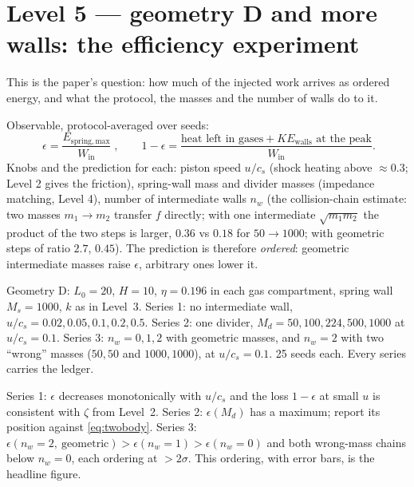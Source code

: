 \documentclass[11pt,a4paper]{article}
\begin{document}
\section{Level 5 --- geometry D and more walls: the efficiency experiment}

\begin{why}
This is the paper's question: how much of the injected work arrives as ordered energy, and what the protocol, the masses and the number of walls do to it.
\end{why}

Observable, protocol-averaged over seeds:
\begin{equation}
\boxed{\;\epsilon = \frac{E_{\mathrm{spring,max}}}{W_{\mathrm{in}}}\;},\qquad
1 - \epsilon = \frac{\text{heat left in gases} + KE_{\mathrm{walls}}\text{ at the peak}}{W_{\mathrm{in}}}.
\label{eq:eps}
\end{equation}
Knobs and the prediction for each: piston speed $u/c_s$ (shock heating above $\approx 0.3$; Level 2 gives the friction), spring-wall mass and divider masses (impedance matching, Level 4), number of intermediate walls $n_w$ (the collision-chain estimate: two masses $m_1 \to m_2$ transfer $f$ directly; with one intermediate $\sqrt{m_1m_2}$ the product of the two steps is larger, $0.36$ vs $0.18$ for $50 \to 1000$; with geometric steps of ratio $2.7$, $0.45$). The prediction is therefore \emph{ordered}: geometric intermediate masses raise $\epsilon$, arbitrary ones lower it.

\begin{run}
Geometry D: $L_0 = 20$, $H = 10$, $\eta = 0.196$ in each gas compartment, spring wall $M_s = 1000$, $k$ as in Level~3. Series 1: no intermediate wall, $u/c_s = 0.02, 0.05, 0.1, 0.2, 0.5$. Series 2: one divider, $M_d = 50, 100, 224, 500, 1000$ at $u/c_s = 0.1$. Series 3: $n_w = 0, 1, 2$ with geometric masses, and $n_w = 2$ with two ``wrong'' masses ($50, 50$ and $1000, 1000$), at $u/c_s = 0.1$. 25 seeds each. Every series carries the ledger.
\end{run}
\begin{pass}
Series 1: $\epsilon$ decreases monotonically with $u/c_s$ and the loss $1 - \epsilon$ at small $u$ is consistent with $\zeta$ from Level~2. Series 2: $\epsilon(M_d)$ has a maximum; report its position against \eqref{eq:twobody}. Series 3: $\epsilon(n_w = 2,\ \text{geometric}) > \epsilon(n_w = 1) > \epsilon(n_w = 0)$ and both wrong-mass chains below $n_w = 0$, each ordering at $> 2\sigma$. This ordering, with error bars, is the headline figure.
\end{pass}
\end{document}
